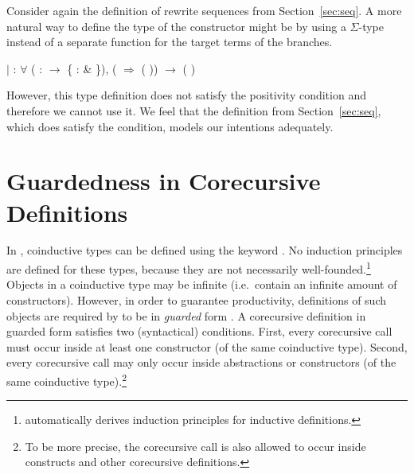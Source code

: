 Consider again the definition of rewrite sequences from
Section~\ref{sec:seq}. A more natural way to define the type of the
 constructor might be
by using a $\Sigma$-type instead of a separate function for the target
terms of the branches.
\begin{singlespace}
\begin{coqdoccode}
\coqdocindent{1.00em}
\ensuremath{|}  :
\ensuremath{\forall}  
( :
\ensuremath{\rightarrow} \{  : 
\& 
 \}),\coqdoceol
\coqdocindent{5.00em}
(  \ensuremath{\Rightarrow}
( )) 
$\rightarrow$ (
)\coqdoceol
\end{coqdoccode}
\end{singlespace}
However, this type definition does not satisfy the positivity
condition and therefore we cannot use it. We feel that the definition
from Section~\ref{sec:seq}, which does satisfy the condition, models
our intentions adequately.


\section{Guardedness in Corecursive Definitions}\label{sec:guardedness}

In \Coq, coinductive types can be defined using the
 keyword \citep{gimenez-casteran-07}. No
induction principles are defined for these types, because they are not
necessarily well-founded.\footnote{\Coq automatically derives induction
  principles for inductive definitions.}
Objects in a coinductive type may be infinite (i.e.\ contain an infinite
amount of constructors). However, in order to guarantee productivity,
definitions of such objects are required by \Coq to be in \emph{guarded}
form \citep{gimenez-94}. A corecursive definition in guarded form
satisfies two (syntactical) conditions. First, every corecursive call
must occur inside at least one constructor (of the same coinductive
type). Second, every corecursive call may only occur inside
abstractions or constructors (of the same coinductive
type).\footnote{To be more precise, the corecursive call is also
  allowed to occur inside  constructs and other
  corecursive definitions.}

